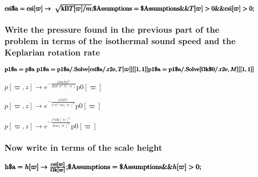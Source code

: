 \documentclass{article}
\begin{document}
\begin{doublespace}
\noindent\(\pmb{\text{csi$\$$a} = \text{csi}[\varpi ] \to \text{  }\sqrt{\text{kB} T[\varpi ]/m};}\\
\pmb{\text{$\$$Assumptions} = \text{$\$$Assumptions} \&\& T[\varpi ] > 0 \&\& \text{csi}[\varpi ] > 0;}\)
\end{doublespace}

\subsubsection*{Write the pressure found in the previous part of the problem in terms of the isothermal sound speed and the Keplarian rotation rate}

\begin{doublespace}
\noindent\(\pmb{\text{p1$\$$a} = \text{p$\$$a}\text{  }}\\
\pmb{\text{p1$\$$a} = \text{p1$\$$a}\text{/.} \text{Solve}[\text{csi$\$$a}\text{/.}\text{r2e},T[\varpi ]][[1,1]]}\\
\pmb{\text{p1$\$$a} = \text{p1$\$$a}\text{/.} \text{Solve}[\text{$\Omega $k$\$$0}\text{/.} \text{r2e}, M][[1,1]]}\)
\end{doublespace}

\begin{doublespace}
\noindent\(p[\varpi ,z]\to e^{-\frac{G m M z^2}{2 \text{kB} \varpi ^3 T[\varpi ]}} \text{p0}[\varpi ]\)
\end{doublespace}

\begin{doublespace}
\noindent\(p[\varpi ,z]\to e^{-\frac{G M z^2}{2 \varpi ^3 \text{csi}[\varpi ]^2}} \text{p0}[\varpi ]\)
\end{doublespace}

\begin{doublespace}
\noindent\(p[\varpi ,z]\to e^{-\frac{z^2 \text{$\Omega $k}[\varpi ]^2}{2 \text{csi}[\varpi ]^2}} \text{p0}[\varpi ]\)
\end{doublespace}

\subsubsection*{Now write in terms of the scale height}

\begin{doublespace}
\noindent\(\pmb{\text{h$\$$a} = h[\varpi ]\to  \frac{\text{csi}[\varpi ]}{\text{$\Omega $k}[\varpi ]};}\\
\pmb{\text{$\$$Assumptions} = \text{$\$$Assumptions} \&\& h[\varpi ] >0;}\)
\end{doublespace}
\end{document}
